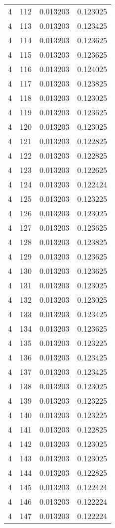 \begin{longtable}{rrrr}
4 & 112 & 0.013203 & 0.123025 \\
4 & 113 & 0.013203 & 0.123425 \\
4 & 114 & 0.013203 & 0.123625 \\
4 & 115 & 0.013203 & 0.123625 \\
4 & 116 & 0.013203 & 0.124025 \\
4 & 117 & 0.013203 & 0.123825 \\
4 & 118 & 0.013203 & 0.123025 \\
4 & 119 & 0.013203 & 0.123625 \\
4 & 120 & 0.013203 & 0.123025 \\
4 & 121 & 0.013203 & 0.122825 \\
4 & 122 & 0.013203 & 0.122825 \\
4 & 123 & 0.013203 & 0.122625 \\
4 & 124 & 0.013203 & 0.122424 \\
4 & 125 & 0.013203 & 0.123225 \\
4 & 126 & 0.013203 & 0.123025 \\
4 & 127 & 0.013203 & 0.123625 \\
4 & 128 & 0.013203 & 0.123825 \\
4 & 129 & 0.013203 & 0.123625 \\
4 & 130 & 0.013203 & 0.123625 \\
4 & 131 & 0.013203 & 0.123025 \\
4 & 132 & 0.013203 & 0.123025 \\
4 & 133 & 0.013203 & 0.123425 \\
4 & 134 & 0.013203 & 0.123625 \\
4 & 135 & 0.013203 & 0.123225 \\
4 & 136 & 0.013203 & 0.123425 \\
4 & 137 & 0.013203 & 0.123425 \\
4 & 138 & 0.013203 & 0.123025 \\
4 & 139 & 0.013203 & 0.123225 \\
4 & 140 & 0.013203 & 0.123225 \\
4 & 141 & 0.013203 & 0.122825 \\
4 & 142 & 0.013203 & 0.123025 \\
4 & 143 & 0.013203 & 0.123025 \\
4 & 144 & 0.013203 & 0.122825 \\
4 & 145 & 0.013203 & 0.122424 \\
4 & 146 & 0.013203 & 0.122224 \\
4 & 147 & 0.013203 & 0.122224 \\

\end{longtable}
